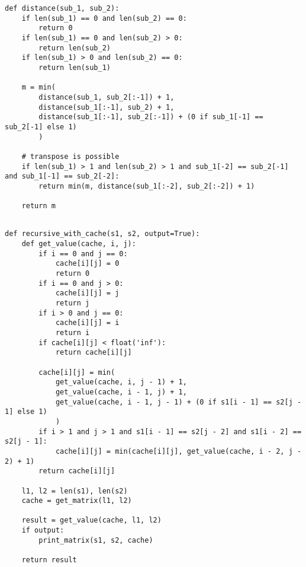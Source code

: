 \begin{center}
	\captionsetup{justification=raggedright,singlelinecheck=off}
\begin{lstlisting}[label=lst:rec,caption=Алгоритм нахождения расстояния Дамерау--Левенштейна (рекурсивный)]
def distance(sub_1, sub_2):
	if len(sub_1) == 0 and len(sub_2) == 0:
		return 0
	if len(sub_1) == 0 and len(sub_2) > 0:
		return len(sub_2)
	if len(sub_1) > 0 and len(sub_2) == 0:
		return len(sub_1)

	m = min(
		distance(sub_1, sub_2[:-1]) + 1,
		distance(sub_1[:-1], sub_2) + 1,
		distance(sub_1[:-1], sub_2[:-1]) + (0 if sub_1[-1] == sub_2[-1] else 1)
		)

	# transpose is possible
	if len(sub_1) > 1 and len(sub_2) > 1 and sub_1[-2] == sub_2[-1] and sub_1[-1] == sub_2[-2]:
		return min(m, distance(sub_1[:-2], sub_2[:-2]) + 1)
	
	return m
		
\end{lstlisting}
\end{center}

\begin{center}
	\captionsetup{justification=raggedright,singlelinecheck=off}
	\begin{lstlisting}[label=lst:rec_cache,caption=Алгоритм нахождения расстояния Дамерау--Левенштейна (рекурсивный с кэшем)]
def recursive_with_cache(s1, s2, output=True):
	def get_value(cache, i, j):
		if i == 0 and j == 0:
			cache[i][j] = 0
			return 0
		if i == 0 and j > 0:
			cache[i][j] = j
			return j
		if i > 0 and j == 0:
			cache[i][j] = i
			return i
		if cache[i][j] < float('inf'):
			return cache[i][j]
		
		cache[i][j] = min(
			get_value(cache, i, j - 1) + 1,
			get_value(cache, i - 1, j) + 1,
			get_value(cache, i - 1, j - 1) + (0 if s1[i - 1] == s2[j - 1] else 1)
			)
		if i > 1 and j > 1 and s1[i - 1] == s2[j - 2] and s1[i - 2] == s2[j - 1]:
			cache[i][j] = min(cache[i][j], get_value(cache, i - 2, j - 2) + 1)
		return cache[i][j]
	
	l1, l2 = len(s1), len(s2)
	cache = get_matrix(l1, l2)
	
	result = get_value(cache, l1, l2)
	if output:
		print_matrix(s1, s2, cache)
	
	return result
	\end{lstlisting}
\end{center}

